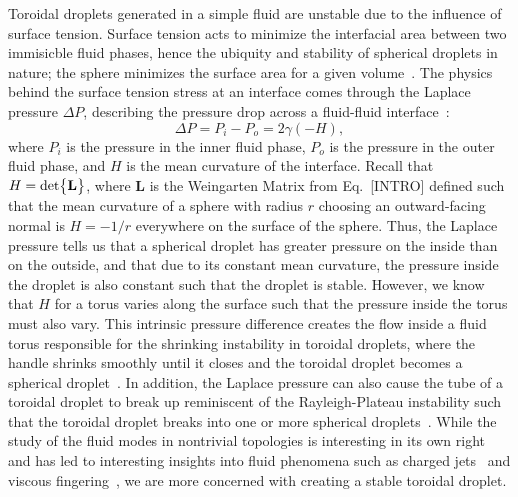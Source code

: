 Toroidal droplets generated in a simple fluid are unstable due to the influence of surface tension.
Surface tension acts to minimize the interfacial area between two immisicble fluid phases, hence the ubiquity and stability of spherical droplets in nature; the sphere minimizes the surface area for a given volume~\cite{RN178}.
The physics behind the surface tension stress at an interface comes through the Laplace pressure $\Delta P$, describing the pressure drop across a fluid-fluid interface~\cite{RN178}:
\begin{equation}\label{e:3-LapPres}
  \Delta P = P_i - P_o = 2 \gamma (- H),
\end{equation}
where $P_i$ is the pressure in the inner fluid phase, $P_o$ is the pressure in the outer fluid phase, and $H$ is the mean curvature of the interface.
Recall that $H = \textup{det}\big \{ \mathbf{L} \big \}$, where $\mathbf{L}$ is the Weingarten Matrix from Eq.~[INTRO] defined such that the mean curvature of a sphere with radius $r$ choosing an outward-facing normal is $H = -1/r$ everywhere on the surface of the sphere.
Thus, the Laplace pressure tells us that a spherical droplet has greater pressure on the inside than on the outside, and that due to its constant mean curvature, the pressure inside the droplet is also constant such that the droplet is stable.
However, we know that $H$ for a torus varies along the surface such that the pressure inside the torus must also vary.
This intrinsic pressure difference creates the flow inside a fluid torus responsible for the shrinking instability in toroidal droplets, where the handle shrinks smoothly until it closes and the toroidal droplet becomes a spherical droplet~\cite{RN29,RN255}.
In addition, the Laplace pressure can also cause the tube of a toroidal droplet to break up reminiscent of the Rayleigh-Plateau instability such that the toroidal droplet breaks into one or more spherical droplets~\cite{RN29,RN256}.
While the study of the fluid modes in nontrivial topologies is interesting in its own right and has led to interesting insights into fluid phenomena such as charged jets~\cite{RN256} and viscous fingering~\cite{RN254}, we are more concerned with creating a stable toroidal droplet. \\

